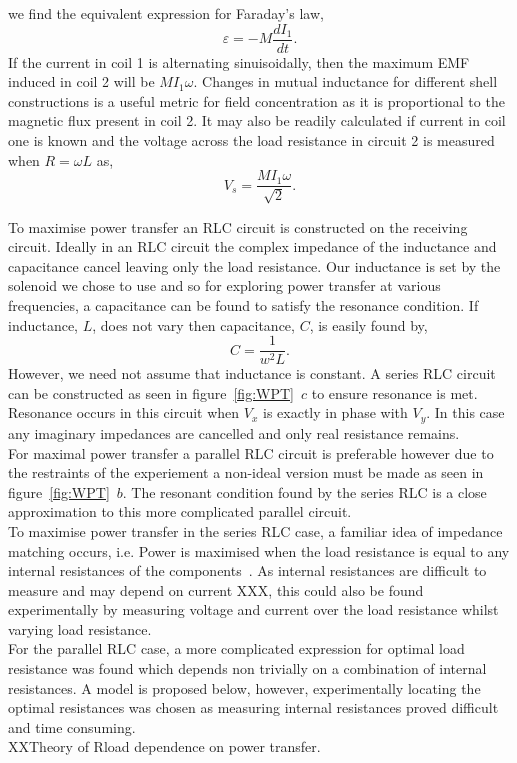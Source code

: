 \documentclass[11pt]{iopart}
\begin{document}
we find the equivalent expression for Faraday's law,
\vspace{-0.5em}
\begin{equation}
  \varepsilon = -M\frac{dI_{1}}{dt}.
  \label{eqn:M}
\end{equation}
If the current in coil 1 is alternating sinuisoidally, then the
maximum EMF induced in coil 2 will be $M I_1 \omega$. Changes in mutual
inductance for different shell constructions is a useful metric for
field concentration as it is proportional to the magnetic flux present
in coil 2. It may also be readily calculated if current in coil one is
known and the voltage across the load resistance in circuit 2 is
measured when $R = \omega L$ as,
\begin{equation}
  V_s = \frac{MI_1\omega}{\sqrt{2}}.
  \label{eqn:MVs}
\end{equation}

To maximise power transfer an RLC circuit is constructed on the
receiving circuit. Ideally in an RLC circuit the complex impedance of
the inductance and capacitance cancel leaving only the load
resistance. Our inductance is set by the solenoid we chose to use and
so for exploring power transfer at various frequencies, a capacitance
can be found to satisfy the resonance condition. If inductance, $L$,
does not vary then capacitance, $C$, is easily found by,
\begin{equation}
  C = \frac{1}{w^2L}.
\end{equation}
However, we need not assume that inductance is constant. A series RLC
circuit can be constructed as seen in figure~\ref{fig:WPT}~$c$ to
ensure resonance is met. Resonance occurs in this circuit when $V_x$
is exactly in phase with $V_y$. In this case any imaginary impedances
are cancelled and only real resistance remains. \\ For maximal power
transfer a parallel RLC circuit is preferable however due to the
restraints of the experiement a non-ideal version must be made as seen
in figure~\ref{fig:WPT}~$b$. The resonant condition found by the
series RLC is a close approximation to this more complicated parallel
circuit. \\
To maximise power transfer in the series RLC case, a familiar idea of
impedance matching occurs, i.e. Power is maximised when the load
resistance is equal to any internal resistances of the
components~\cite{XXX}. As internal resistances are difficult to
measure and may depend on current XXX, this could also be found
experimentally by measuring voltage and current over the load
resistance whilst varying load resistance. \\ For the parallel RLC
case, a more complicated expression for optimal load resistance was
found which depends non trivially on a combination of internal
resistances. A model is proposed below, however, experimentally
locating the optimal resistances was chosen as measuring internal
resistances proved difficult and time consuming.\\
XXTheory of Rload dependence on power transfer. \\
\end{document}
